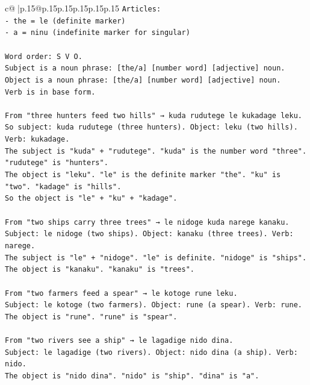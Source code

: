 \documentclass{article}
\begin{document}
{\begin{supertabular}{c@{$\;$}|p{.15\linewidth}@{}p{.15\linewidth}p{.15\linewidth}p{.15\linewidth}p{.15\linewidth}p{.15\linewidth}}
{{{\texttt{Articles:} \\
\texttt{{-} the = le (definite marker)} \\
\texttt{{-} a = ninu (indefinite marker for singular)} \\
\\ 
\texttt{Word order: S V O.} \\
\texttt{Subject is a noun phrase: {[}the/a{]} {[}number word{]} {[}adjective{]} noun.} \\
\texttt{Object is a noun phrase: {[}the/a{]} {[}number word{]} {[}adjective{]} noun.} \\
\texttt{Verb is in base form.} \\
\\ 
\texttt{From "three hunters feed two hills" → kuda rudutege le kukadage leku.} \\
\texttt{So subject: kuda rudutege (three hunters). Object: leku (two hills). Verb: kukadage.} \\
\texttt{The subject is "kuda" + "rudutege". "kuda" is the number word "three". "rudutege" is "hunters".} \\
\texttt{The object is "leku". "le" is the definite marker "the". "ku" is "two". "kadage" is "hills".} \\
\texttt{So the object is "le" + "ku" + "kadage".} \\
\\ 
\texttt{From "two ships carry three trees" → le nidoge kuda narege kanaku.} \\
\texttt{Subject: le nidoge (two ships). Object: kanaku (three trees). Verb: narege.} \\
\texttt{The subject is "le" + "nidoge". "le" is definite. "nidoge" is "ships".} \\
\texttt{The object is "kanaku". "kanaku" is "trees".} \\
\\ 
\texttt{From "two farmers feed a spear" → le kotoge rune leku.} \\
\texttt{Subject: le kotoge (two farmers). Object: rune (a spear). Verb: rune.} \\
\texttt{The object is "rune". "rune" is "spear".} \\
\\ 
\texttt{From "two rivers see a ship" → le lagadige nido dina.} \\
\texttt{Subject: le lagadige (two rivers). Object: nido dina (a ship). Verb: nido.} \\
\texttt{The object is "nido dina". "nido" is "ship". "dina" is "a".} \\
}}}
\end{supertabular}}
\end{document}
